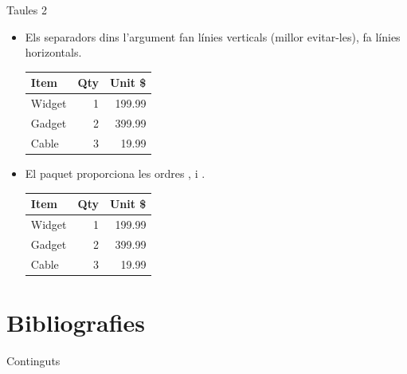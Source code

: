 \begin{frame}[fragile]{Taules 2}
\begin{itemize}
\item Els separadors \keystrokebftt{|} dins l'argument fan línies verticals (millor evitar-les),  fa línies horizontals. 
\begin{exampletwouptiny}
\begin{tabular}{|l|r|r|}
    \hline
    Item   & Qty & Unit \$ \\
    \hline
    Widget & 1   & 199.99  \\
    Gadget & 2   & 399.99  \\
    Cable  & 3   & 19.99   \\
    \hline
\end{tabular}
\end{exampletwouptiny}
\item El paquet  proporciona les ordres ,  i . 
\begin{exampletwouptiny}
\begin{tabular}{lrr}
    \toprule
    Item   & Qty & Unit \$ \\
    \midrule
    Widget & 1   & 199.99  \\
    Gadget & 2   & 399.99  \\
    Cable  & 3   & 19.99   \\
    \bottomrule
\end{tabular}
\end{exampletwouptiny}
\end{itemize}
\end{frame}

\section{Bibliografies}

\begin{frame}{Continguts}
\begin{multicols}{2}
\tableofcontents[currentsection]
\end{multicols}
\end{frame}


